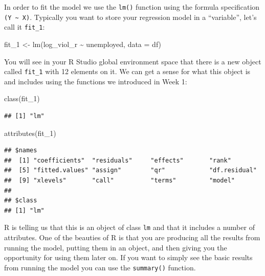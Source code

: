 \documentclass[
]{book}
\newenvironment{Shaded}{\begin{snugshade}}{\end{snugshade}}
\newcommand{\AttributeTok}[1]{\textcolor[rgb]{0.77,0.63,0.00}{#1}}
\newcommand{\FunctionTok}[1]{\textcolor[rgb]{0.00,0.00,0.00}{#1}}
\newcommand{\NormalTok}[1]{#1}
\newcommand{\OtherTok}[1]{\textcolor[rgb]{0.56,0.35,0.01}{#1}}
\newcommand{\SpecialCharTok}[1]{\textcolor[rgb]{0.00,0.00,0.00}{#1}}
\begin{document}
In order to fit the model we use the \texttt{lm()} function using the formula specification \texttt{(Y\ \textasciitilde{}\ X)}. Typically you want to store your regression model in a ``variable'', let's call it \texttt{fit\_1}:

\begin{Shaded}
\begin{Highlighting}[]
\NormalTok{fit\_1 }\OtherTok{\textless{}{-}} \FunctionTok{lm}\NormalTok{(log\_viol\_r }\SpecialCharTok{\textasciitilde{}}\NormalTok{ unemployed, }\AttributeTok{data =}\NormalTok{ df)}
\end{Highlighting}
\end{Shaded}

You will see in your R Studio global environment space that there is a new object called \texttt{fit\_1} with 12 elements on it. We can get a sense for what this object is and includes using the functions we introduced in Week 1:

\begin{Shaded}
\begin{Highlighting}[]
\FunctionTok{class}\NormalTok{(fit\_1)}
\end{Highlighting}
\end{Shaded}

\begin{verbatim}
## [1] "lm"
\end{verbatim}

\begin{Shaded}
\begin{Highlighting}[]
\FunctionTok{attributes}\NormalTok{(fit\_1)}
\end{Highlighting}
\end{Shaded}

\begin{verbatim}
## $names
##  [1] "coefficients"  "residuals"     "effects"       "rank"         
##  [5] "fitted.values" "assign"        "qr"            "df.residual"  
##  [9] "xlevels"       "call"          "terms"         "model"        
## 
## $class
## [1] "lm"
\end{verbatim}

R is telling us that this is an object of class \texttt{lm} and that it includes a number of attributes. One of the beauties of R is that you are producing all the results from running the model, putting them in an object, and then giving you the opportunity for using them later on. If you want to simply see the basic results from running the model you can use the \texttt{summary()} function.
\end{document}
